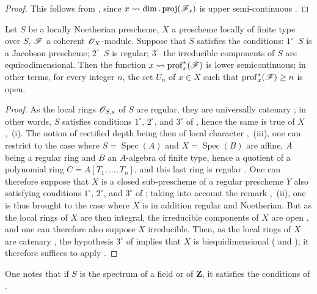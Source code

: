 \begin{proof}
This follows from , since $x\leadsto\dim.\operatorname{proj}(\mathscr{F}_x)$ is upper semi-continuous .
\end{proof}

\begin{proposition}[10.8.5]
\label{IV.10.8.5}
Let $S$ be a locally Noetherian prescheme, $X$ a prescheme locally of finite type over $S$, $\mathscr{F}$ a coherent $\mathscr{O}_X$-module.
Suppose that $S$ satisfies the conditions: $1^\circ$~$S$ is a Jacobson prescheme; $2^\circ$~$S$ is regular; $3^\circ$~the irreducible components of $S$ are equicodimensional.
Then the function $x\leadsto\operatorname{prof}^*_x(\mathscr{F})$ is lower semicontinuous; in other terms, for every integer $n$, the set $U_n$ of $x\in X$ such that $\operatorname{prof}^*_x(\mathscr{F})\geq n$ is open.
\end{proposition}

\begin{proof}
As the local rings $\mathscr{O}_{S,s}$ of $S$ are regular, they are universally catenary ; in other words, $S$ satisfies conditions $1^\circ$, $2^\circ$, and $3^\circ$ of , hence the same is true of $X$ ,~(i).
The notion of rectified depth being then of local character ,~(iii), one can restrict to the case where $S=\operatorname{Spec}(A)$ and $X=\operatorname{Spec}(B)$ are affine, $A$ being a regular ring and $B$ an $A$-algebra of finite type, hence a quotient of a polynomial ring $C=A[T_1,\ldots,T_n]$, and this last ring is regular .
One can therefore suppose that $X$ is a closed sub-prescheme of a regular prescheme $Y$ also satisfying conditions $1^\circ$, $2^\circ$, and $3^\circ$ of ; taking into account the remark ,~(ii), one is thus brought to the case where $X$ is in addition regular and Noetherian.
But as the local rings of $X$ are then integral, the irreducible components of $X$ are
open , and one can therefore also suppose $X$ irreducible.
Then, as the local rings of $X$ are catenary , the hypothesis $3^\circ$ of  implies that $X$ is biequidimensional ( and ); it therefore suffices to apply .
\end{proof}

One notes that if $S$ is the spectrum of a field or of $\mathbf{Z}$, it satisfies the conditions of .

